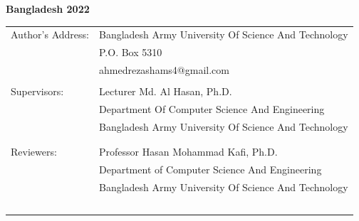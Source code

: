 \documentclass[a4paper,12pt]{article}
\begin{document}
\begin{center}
\vspace*{1cm}

{\bf Bangladesh 2022}

\newpage
\vspace*{-2.2cm}

\begin{tabular}{ll}
Author's Address:
& Bangladesh Army University Of Science And Technology \\
& P.O. Box 5310 \\
& ahmedrezashams4@gmail.com \\
\\
Supervisors:
& Lecturer Md. Al Hasan, Ph.D.\\
& Department Of Computer Science And Engineering\\%
& Bangladesh Army University Of Science And Technology\\
\\
\\
Reviewers:
& Professor Hasan Mohammad Kafi, Ph.D.\\
& Department of Computer Science And Engineering\\
& Bangladesh Army University Of Science And Technology \\
\
\\
\end{tabular}

\vfill


\end{center}
\newpage
\end{document}
